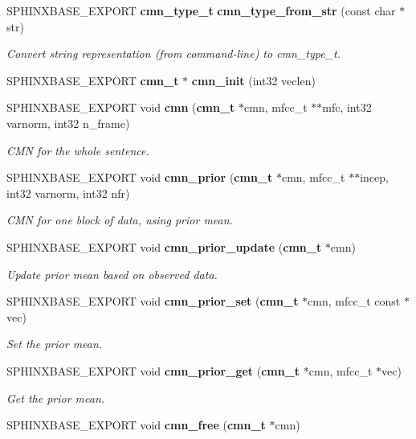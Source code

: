 \begin{CompactItemize}
\item 
SPHINXBASE\_\-EXPORT {\bf cmn\_\-type\_\-t} {\bf cmn\_\-type\_\-from\_\-str} (const char $\ast$str)\label{cmn_8h_cf5e65a03a0d74630add4a400fed0ce8}

\begin{CompactList}\small\item\em Convert string representation (from command-line) to cmn\_\-type\_\-t. \item\end{CompactList}\item 
SPHINXBASE\_\-EXPORT {\bf cmn\_\-t} $\ast$ \textbf{cmn\_\-init} (int32 veclen)\label{cmn_8h_7ba6ce5489afce232b9bb61bd2ebd20f}

\item 
SPHINXBASE\_\-EXPORT void {\bf cmn} ({\bf cmn\_\-t} $\ast$cmn, mfcc\_\-t $\ast$$\ast$mfc, int32 varnorm, int32 n\_\-frame)
\begin{CompactList}\small\item\em CMN for the whole sentence. \item\end{CompactList}\item 
SPHINXBASE\_\-EXPORT void {\bf cmn\_\-prior} ({\bf cmn\_\-t} $\ast$cmn, mfcc\_\-t $\ast$$\ast$incep, int32 varnorm, int32 nfr)
\begin{CompactList}\small\item\em CMN for one block of data, using prior mean. \item\end{CompactList}\item 
SPHINXBASE\_\-EXPORT void {\bf cmn\_\-prior\_\-update} ({\bf cmn\_\-t} $\ast$cmn)\label{cmn_8h_ae61df2ec71082520669fc63d94bb1ef}

\begin{CompactList}\small\item\em Update prior mean based on observed data. \item\end{CompactList}\item 
SPHINXBASE\_\-EXPORT void {\bf cmn\_\-prior\_\-set} ({\bf cmn\_\-t} $\ast$cmn, mfcc\_\-t const $\ast$vec)\label{cmn_8h_0f6f70d51143d6a33130650b8d4758ab}

\begin{CompactList}\small\item\em Set the prior mean. \item\end{CompactList}\item 
SPHINXBASE\_\-EXPORT void {\bf cmn\_\-prior\_\-get} ({\bf cmn\_\-t} $\ast$cmn, mfcc\_\-t $\ast$vec)\label{cmn_8h_4f624f5b805288f66fa05b79b1e4f383}

\begin{CompactList}\small\item\em Get the prior mean. \item\end{CompactList}\item 
SPHINXBASE\_\-EXPORT void \textbf{cmn\_\-free} ({\bf cmn\_\-t} $\ast$cmn)\label{cmn_8h_0f70f378107e3d4e861e39d4f76d8d50}

\end{CompactItemize}
